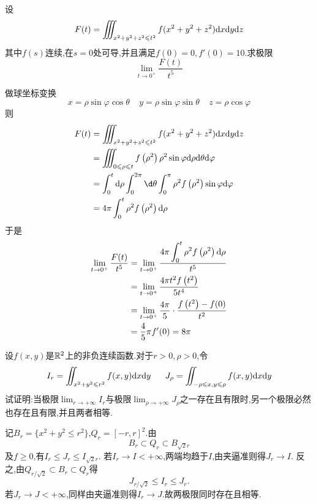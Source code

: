 \documentclass{ctexart}
\begin{document}
\begin{problem}[6.(10\songti{分})]
    设
    \[F(t)=\iiint_{x^2+y^2+z^2\leqslant t^2}f(x^2+y^2+z^2)\mathrm{d} x\mathrm{d} y\mathrm{d} z\]
    其中$f(s)$连续,在$s=0$处可导,并且满足$f(0)=0,f'(0)=10$.求极限
    \[\lim_{t\to0^+}\dfrac{F(t)}{t^5}\]

\end{problem}
\begin{solution}
    做球坐标变换
    \[x=\rho\sin\varphi\cos\theta\ \ \ \ \ y=\rho\sin\varphi\sin\theta\ \ \ \ \ z=\rho\cos\varphi\]
    则
    \[\begin{aligned}
        F(t)
        &= \iiint_{x^2+y^2+z^2\leqslant t^2}f(x^2+y^2+z^2)\dx\di y\di z \\
        &= \iiint_{0\leqslant\rho\leqslant t}f\left(\rho^2\right)\rho^2\sin\varphi\di\rho\di\theta\di\varphi \\
        &= \int_0^t\di\rho\int_0^{2\pi}\d\theta\int_0^{\pi}\rho^2f\left(\rho^2\right)\sin\varphi\di\varphi \\
        &= 4\pi\int_0^{t}\rho^2f\left(\rho^2\right)\di\rho
    \end{aligned}\]
    于是
    \[\begin{aligned}
        \lim_{t\to0^+}\dfrac{F(t)}{t^5}
        &= \lim_{t\to0^+}\dfrac{\displaystyle4\pi\int_0^{t}\rho^2f\left(\rho^2\right)\mathrm{d}\rho}{t^5} \\
        &= \lim_{t\to0^+}\dfrac{4\pi t^2f\left(t^2\right)}{5t^4} \\
        &= \lim_{t\to0^+}\dfrac{4\pi}{5}\cdot\dfrac{f\left(t^2\right)-f(0)}{t^2} \\
        &= \dfrac45\pi f'(0)=8\pi
    \end{aligned}\]

\end{solution}
\begin{problem}[7.(10\songti{分})]
    设$f(x,y)$是$\mathbb{R}^2$上的非负连续函数.对于$r>0,\rho>0$,令
    \[I_r=\iint_{x^2+y^2\leqslant r^2}f(x,y)\mathrm{d} x\mathrm{d} y\ \ \ \ \ J_{\rho}=\iint_{-\rho\leqslant x,y\leqslant\rho}f(x,y)\mathrm{d} x\mathrm{d} y\]
    试证明:当极限$\displaystyle\lim_{r\to+\infty}I_r$与极限$\displaystyle\lim_{\rho\to+\infty}J_\rho$之一存在且有限时,另一个极限必然也存在且有限,并且两者相等.
\end{problem}
\begin{solution}
记$B_r=\{x^2+y^2\leqslant r^2\}$,$Q_r=[-r,r]^2$.由
    \[B_r\subset Q_r\subset B_{\sqrt2r}\]
    及$f\geqslant0$,有$I_r\leqslant J_r\leqslant I_{\sqrt2r}$.
    若$I_r\to I<+\infty$,两端均趋于$I$,由夹逼准则得$J_r\to I$.
    反之,由$Q_{r/\sqrt2}\subset B_r\subset Q_r$得
    \[J_{r/\sqrt2}\leqslant I_r\leqslant J_r.\]
    若$J_r\to J<+\infty$,同样由夹逼准则得$I_r\to J$.故两极限同时存在且相等.
\end{solution}
\end{document}
